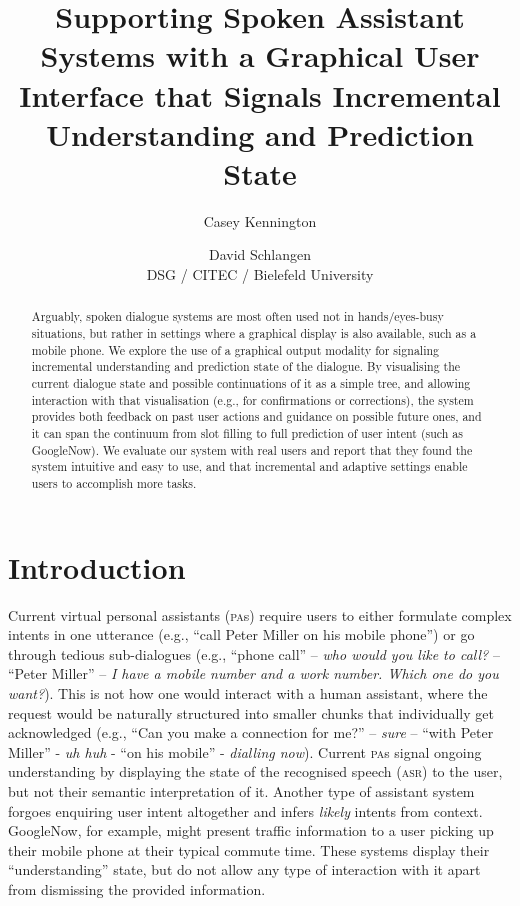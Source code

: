 \documentclass[11pt]{article}
\title{Supporting Spoken Assistant Systems with a Graphical User\\ Interface that Signals Incremental Understanding and Prediction State}
\author{Casey Kennington \and David Schlangen\\DSG / CITEC / Bielefeld University}
\newcommand{\asr}[0]{\textsc{asr}}
\newcommand{\pa}[0]{\textsc{pa}}
\begin{document}

\maketitle

\begin{abstract}
Arguably, spoken dialogue systems are most often used not in hands/eyes-busy situations, but rather in settings where a graphical display is also available, such as a mobile phone. We explore the use of a graphical output modality for signaling incremental understanding and prediction state of the dialogue. By visualising the current dialogue state and possible continuations of it as a simple tree, and allowing interaction with that visualisation (e.g., for confirmations or corrections), the system provides both feedback on past user actions and guidance on possible future ones, and it can span the continuum from slot filling to full prediction of user intent (such as GoogleNow). We evaluate our system with real users and report that they found the system intuitive and easy to use, and that incremental and adaptive settings enable users to accomplish more tasks.
\end{abstract}

\section{Introduction}
\label{section:intro}

Current virtual personal assistants (\pa s) require users to either formulate complex intents in one utterance (e.g., ``call Peter Miller on his mobile phone'') or go through tedious sub-dialogues (e.g., ``phone call'' -- \emph{who would you like to call?} -- ``Peter Miller'' -- \emph{I have a mobile number and a work number. Which one do you want?}). This is not how one would interact with a human assistant, where the request would be naturally structured into smaller chunks that individually get acknowledged (e.g., ``Can you make a connection for me?'' -- \emph{sure} -- ``with Peter Miller'' - \emph{uh huh} - ``on his mobile'' - \emph{dialling now}). Current \pa s signal ongoing understanding by displaying the state of the recognised speech (\asr) to the user, but not their semantic interpretation of it. Another type of assistant system forgoes enquiring user intent altogether and infers \emph{likely} intents from context. GoogleNow, for example, might present traffic information to a user picking up their mobile phone at their typical commute time. These systems display their ``understanding'' state, but do not allow any type of interaction with it apart from dismissing the provided information.
\end{document}

